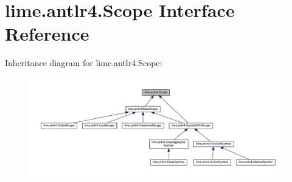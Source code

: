 \hypertarget{interfacelime_1_1antlr4_1_1Scope}{}\section{lime.\+antlr4.\+Scope Interface Reference}
\label{interfacelime_1_1antlr4_1_1Scope}


Inheritance diagram for lime.\+antlr4.\+Scope\+:
\nopagebreak
\begin{figure}[H]
\begin{center}
\leavevmode
\includegraphics[width=350pt]{interfacelime_1_1antlr4_1_1Scope__inherit__graph}
\end{center}
\end{figure}
